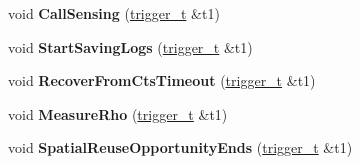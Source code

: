 \begin{DoxyCompactItemize}
void {\bfseries Call\+Sensing} (\hyperlink{classtrigger__t}{trigger\+\_\+t} \&t1)
\item 
\mbox{\label{classcompcxx__Node__23_ad603c32fa7b489a807ede5a574c24593}} 
void {\bfseries Start\+Saving\+Logs} (\hyperlink{classtrigger__t}{trigger\+\_\+t} \&t1)
\item 
\mbox{\label{classcompcxx__Node__23_a4486e11d7d0971f9e3fdb2b736a3d7e4}} 
void {\bfseries Recover\+From\+Cts\+Timeout} (\hyperlink{classtrigger__t}{trigger\+\_\+t} \&t1)
\item 
\mbox{\label{classcompcxx__Node__23_a21ef896d2afa27199aa0881633737a62}} 
void {\bfseries Measure\+Rho} (\hyperlink{classtrigger__t}{trigger\+\_\+t} \&t1)
\item 
\mbox{\label{classcompcxx__Node__23_a5ebe121b9c18422f4d90ba8289728fda}} 
void {\bfseries Spatial\+Reuse\+Opportunity\+Ends} (\hyperlink{classtrigger__t}{trigger\+\_\+t} \&t1)
\end{DoxyCompactItemize}
